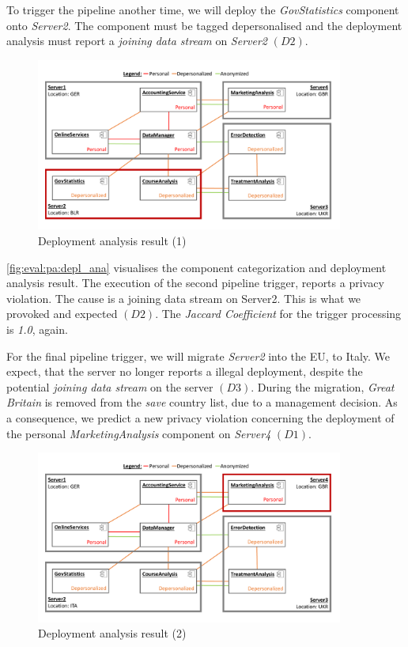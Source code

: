 To trigger the pipeline another time, we will deploy the \textit{GovStatistics} component onto \textit{Server2}. The component must be tagged depersonalised and the deployment analysis must report a \textit{joining data stream} on \textit{Server2} $(D2)$.

\begin{figure}[h]
	\centering
	\includegraphics[trim = 0mm 10mm 0mm 10mm, clip, width=0.90\textwidth]{graphs/medSys_eval_pa_da}
	\caption{Deployment analysis result (1)}
	\label{fig:eval:pa:depl_ana}
\end{figure}

\autoref{fig:eval:pa:depl_ana} visualises the component categorization and deployment analysis result. The execution of the second pipeline trigger, reports a privacy violation. The cause is a joining data stream on Server2. This is what we provoked and expected $(D2)$. The \textit{Jaccard Coefficient} for the trigger processing is \textit{1.0}, again.

For the final pipeline trigger, we will migrate \textit{Server2} into the EU, to Italy. We expect, that the server no longer reports a illegal deployment, despite the potential \textit{joining data stream} on the server $(D3)$. During the migration, \textit{Great Britain} is removed from the \textit{save} country list, due to a management decision. As a consequence, we predict a new privacy violation concerning the deployment of the personal \textit{MarketingAnalysis} component on \textit{Server4} $(D1)$.

\begin{figure}[h]
	\centering
	\includegraphics[trim = 0mm 10mm 0mm 10mm, clip, width=0.90\textwidth]{graphs/medSys_eval_pa_da_2}
	\caption{Deployment analysis result (2)}
	\label{fig:eval:pa:depl_ana_2}
\end{figure}

